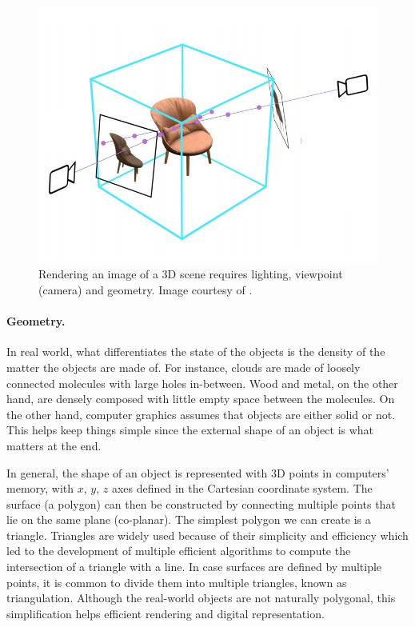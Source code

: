 \begin{figure}
  \centering
   \includegraphics[width=0.7\linewidth]{Images/scene_with_camera.jpg}
   \caption{Rendering an image of a 3D scene requires lighting, viewpoint (camera) and geometry. Image courtesy of \citeauthor{boss2021nerd} \cite{boss2021nerd}.}
   \label{fig:teaser}
\end{figure}


\paragraph{Geometry.} In real world, what differentiates the state of the objects is the density of the matter the objects are made of. For instance, clouds are made of loosely connected molecules with large holes in-between. Wood and metal, on the other hand, are densely composed with little empty space between the molecules. On the other hand, computer graphics assumes that objects are either solid or not. This helps keep things simple since the external shape of an object is what matters at the end. 


In general, the shape of an object is represented with 3D points in computers' memory, with $x$, $y$, $z$ axes defined in the Cartesian coordinate system. The surface (a polygon) can then be constructed by connecting multiple points that lie on the same plane (co-planar). The simplest polygon we can create is a triangle. Triangles are widely used because of their simplicity and efficiency which led to the development of multiple efficient algorithms to compute the intersection of a triangle with a line. In case surfaces are defined by multiple points, it is common to  divide them into multiple triangles, known as triangulation. Although the real-world objects are not naturally polygonal, this simplification helps efficient rendering and digital representation.

